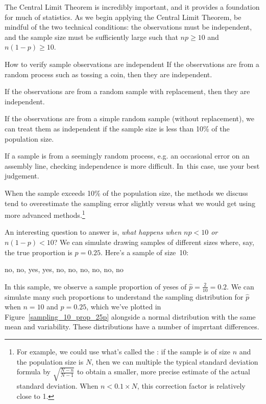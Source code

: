 The Central Limit Theorem is incredibly important, and it provides
a foundation for much of statistics.
As we begin applying
the Central Limit Theorem, be mindful of the two
technical conditions:
the observations must be independent, and the sample size must
be sufficiently large such that $np \geq 10$ and $n(1-p) \geq 10$.

\begin{onebox}{How to verify sample observations are independent}
  If the observations are from a random process such as tossing a coin, then they are independent.\stdvspace{}

  If the observations are from a random sample with replacement,
  then they are independent.\stdvspace{}

  If the observations are from a simple random sample (without replacement), we can treat them as independent if the sample size is less than 10\% of the population size.\stdvspace{}

  If a sample is from a seemingly random process,
  e.g. an occasional error on an assembly line,
  checking independence is more difficult. In~this case,
  use your best judgement.
\end{onebox}

When the sample exceeds 10\% of the population size,
the methods we discuss tend to overestimate the sampling error
slightly versus what we would get using more advanced
methods.\footnote{For example, we could use what's called the
  :
  if the sample is of size $n$ and the population size is $N$,
  then we can multiple the typical standard deviation formula by
  $\sqrt{\frac{N-n}{N-1}}$
  to obtain a smaller, more precise estimate of the
  actual standard deviation.
  When $n < 0.1 \times N$, this correction factor is relatively close to 1.}


An interesting question to answer is, \emph{what happens when
$np < 10$ or $n(1-p) < 10$}? We can simulate drawing samples of different sizes where,
say, the true proportion is $p = 0.25$.
Here's a sample of size~10:
\begin{center}
no, no, yes, yes, no, no, no, no, no, no
\end{center}
In this sample, we observe a sample proportion of yeses
of $\hat{p} = \frac{2}{10} = 0.2$. We can simulate many such
proportions to understand the sampling distribution for
$\hat{p}$ when $n = 10$ and $p = 0.25$, which we've plotted
in Figure~\ref{sampling_10_prop_25p}
alongside a normal distribution with the
same mean and variability.
These distributions have a number of imprrtant differences.

